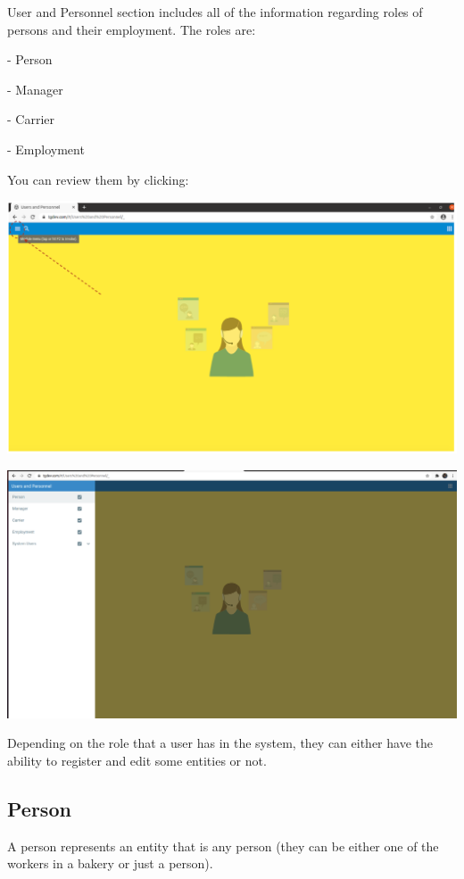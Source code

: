 User and Personnel section includes all of the information regarding roles of persons and their employment. The roles are:

- Person 

- Manager

- Carrier

- Employment

You can review them by clicking:

\includegraphics[width=\textwidth]{sections/01-chapter/images/review1.png}



\includegraphics[width=\textwidth]{sections/01-chapter/images/personnel.png}



Depending on the role that a user has in the system, they can either have the ability to register and edit some entities or not. 

\subsection{Person}
A person represents an entity that is any person (they can be either one of the workers in a bakery or just a person).

